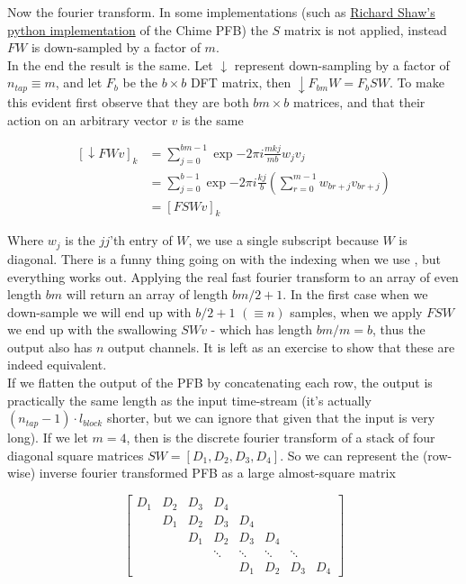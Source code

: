 \documentclass[12pt]{article}
\newcommand{\ntap}{n_{tap}}
\newcommand{\lblock}{l_{block}}
\begin{document}
Now the fourier transform. In some implementations (such as \href{https://github.com/jrs65/pfb-inverse}{Richard Shaw's python implementation} of the Chime PFB) the $S$ matrix is not applied, instead $FW$ is down-sampled by a factor of $m$. \\ 

In the end the result is the same. Let $\downarrow$ represent down-sampling by a factor of $\ntap\equiv m$, and let $F_b$ be the $b\times b$ DFT matrix, then $\downarrow F_{bm}W = F_{b}SW$. To make this evident first observe that they are both $bm \times b$ matrices, and that their action on an arbitrary vector $v$ is the same

$$\begin{aligned}\left[\downarrow FW v\right]_k &= \sum_{j=0}^{bm-1}\exp{-2\pi i\frac{mk j}{mb}}w_{j} v_j\\ 
&= \sum_{j=0}^{b-1}\exp{-2\pi i\frac{kj}{b}}\left(\sum_{r=0}^{m-1}w_{br + j}v_{br+j}\right)\\ &= \left[ FSW v \right]_k \end{aligned}$$

Where $w_j$ is the $jj$'th entry of $W$, we use a single subscript because $W$ is diagonal. There is a funny thing going on with the indexing when we use , but everything works out. Applying the real fast fourier transform to an array of even length $bm$ will return an array of length $bm/2+1$. In the first case when we down-sample we will end up with $b/2 + 1 \,\,(\equiv n)$ samples, when we apply $FSW$ we end up with the  swallowing $SW v$ - which has length $bm/m = b$, thus the output also has $n$ output channels. It is left as an exercise to show that these are indeed equivalent. \\

If we flatten the output of the PFB by concatenating each row, the output is practically the same length as the input time-stream (it's actually $(\ntap-1)\cdot\lblock$ shorter, but we can ignore that given that the input is very long). If we let $m=4$, then  is the discrete fourier transform of a stack of four diagonal square matrices $SW = [D_1,D_2,D_3,D_4]$. So we can represent the (row-wise) inverse fourier transformed PFB as a large almost-square matrix

\begin{equation}\label{eq:pfb matrix}
\begin{bmatrix}
    D_1 & D_2 & D_3 & D_4 & &&& \\
    & D_1 & D_2 & D_3 & D_4 & && \\ 
    && D_1 & D_2 & D_3 & D_4 & & \\ 
    &&& \ddots & \ddots & \ddots & \ddots & \\
    &&&&  D_1 & D_2 & D_3 & D_4
\end{bmatrix}
\end{equation}
\end{document}
